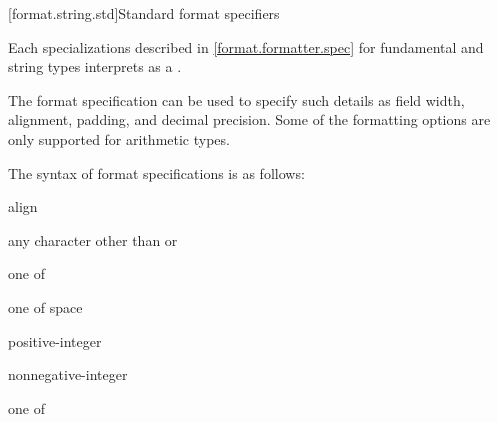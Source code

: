 [format.string.std]{Standard format specifiers}

\pnum
Each  specializations
described in \ref{format.formatter.spec}
for fundamental and string types
interprets  as a
.
\begin{note}
The format specification can be used to specify such details as
field width, alignment, padding, and decimal precision.
Some of the formatting options
are only supported for arithmetic types.
\end{note}
The syntax of format specifications is as follows:
\begin{ncbnf}
\br
      \opt{\noncxxterminal{\#}}     
\end{ncbnf}

\begin{ncbnf}
\br
     align
\end{ncbnf}

\begin{ncbnf}
\br
    \textnormal{any character other than \noncxxtcode{\{} or \noncxxtcode{\}}}
\end{ncbnf}

\begin{ncbnf}
 \textnormal{one of}\br
    \noncxxterminal{< > \caret}
\end{ncbnf}

\begin{ncbnf}
 \textnormal{one of}\br
    \noncxxterminal{+ -} \textnormal{space}
\end{ncbnf}

\begin{ncbnf}
\br
    positive-integer\br
    \noncxxterminal{\{}  \noncxxterminal{\}}
\end{ncbnf}

\begin{ncbnf}
\br
     nonnegative-integer\br
     \noncxxterminal{\{}  \noncxxterminal{\}}
\end{ncbnf}

\begin{ncbnf}
 \textnormal{one of}\br
\end{ncbnf}

